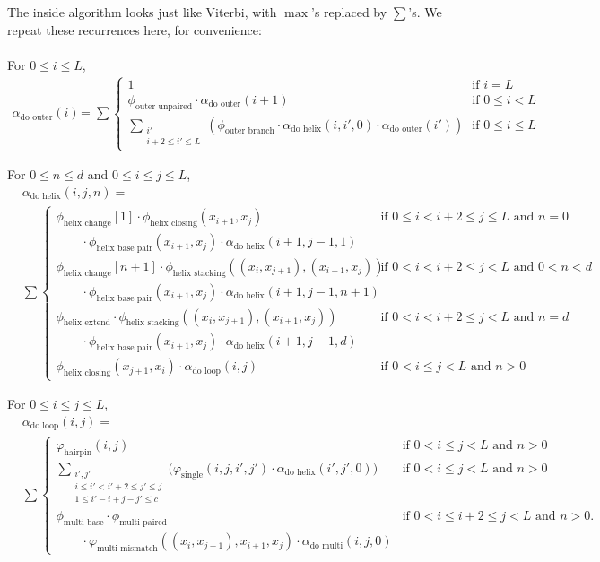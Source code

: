 \documentclass{article}
\newcommand{\Adoouter}{\alpha_\text{do outer}}
\newcommand{\outerunpaired}{\phi_\text{outer unpaired}}
\newcommand{\outerbranch}{\phi_\text{outer branch}}
\newcommand{\vhairpin}{\varphi_\text{hairpin}}
\newcommand{\multimismatch}{\varphi_\text{multi mismatch}}
\newcommand{\helixstacking}{\phi_\text{helix stacking}}
\newcommand{\helixbasepair}{\phi_\text{helix base pair}}
\newcommand{\helixextend}{\phi_\text{helix extend}}
\newcommand{\helixclosing}{\phi_\text{helix closing}}
\newcommand{\helixchange}{\phi_\text{helix change}}
\newcommand{\Adoloop}{\alpha_\text{do loop}}
\newcommand{\single}{\varphi_\text{single}}
\newcommand{\Adomulti}{\alpha_\text{do multi}}
\newcommand{\multibase}{\phi_\text{multi base}}
\newcommand{\multipaired}{\phi_\text{multi paired}}
\newcommand{\Adohelix}{\alpha_\text{do helix}}
\begin{document}
  The inside algorithm looks just like Viterbi, with $\max$'s replaced by $\sum$'s.  We repeat
  these recurrences here, for convenience: \\
  \\
  \noindent
  For $0 \le i \le L$,
  \begin{align*}
    \Adoouter(i) &= \sum \begin{cases}
      1 & \text{if $i=L$} \\
      \outerunpaired \cdot \Adoouter(i+1) & \text{if $0 \le i < L$} \\
      \displaystyle \sum_{\substack{i' \\ i+2 \le i' \le L}} \left(\outerbranch \cdot \Adohelix(i,i',0) \cdot \Adoouter(i')\right)
      & \text{if $0 \le i \le L$}
    \end{cases}
  \end{align*}
  
  \noindent
  For $0 \le n \le d$ and $0 \le i \le j \le L$,
  \begin{align*}
    &\Adohelix(i,j,n) = \\
    &\sum \begin{cases}
      \helixchange[1] \cdot \helixclosing (x_{i+1}, x_j) & \text{if $0 \le i < i+2\le j \le L$ and $n=0$} \\
      \qquad{} \cdot \helixbasepair (x_{i+1}, x_j) \cdot \Adohelix(i+1,j-1,1) \\
      \helixchange[n+1] \cdot \helixstacking((x_{i},x_{j+1}),(x_{i+1},x_{j})) & \text{if $0 < i < i+2\le j < L$ and $0 < n < d$} \\
      \qquad{} \cdot \helixbasepair (x_{i+1}, x_j) \cdot \Adohelix(i+1,j-1,n+1) \\
      \helixextend \cdot \helixstacking((x_{i},x_{j+1}),(x_{i+1},x_{j})) & \text{if $0<i<i+2\le j<L$ and $n=d$} \\
      \qquad{} \cdot \helixbasepair (x_{i+1}, x_j) \cdot \Adohelix(i+1,j-1,d) \\
      \helixclosing (x_{j+1}, x_i) \cdot \Adoloop(i,j) & \text{if $0<i\le j<L$ and $n>0$} 
    \end{cases}
  \end{align*}

  \noindent
  For $0 \le i \le j \le L$,
  \begin{align*}
    &\Adoloop(i,j) = \\
    &\sum \begin{cases}
      \vhairpin(i,j) & \text{if $0<i\le j<L$ and $n>0$} \\
      \displaystyle \sum_{\substack{i', j' \\ i \le i' < i'+2 \le j' \le j \\ 1 \le i'-i + j-j' \le c}}
      \bigl(\single(i,j,i',j') \cdot \Adohelix(i',j',0)\bigr) & \text{if $0<i\le j<L$ and $n>0$} \\
      \multibase \cdot \multipaired & \text{if $0<i\le i+2 \le j<L$ and $n>0$.} \\
      \qquad{} \cdot \multimismatch((x_i,x_{j+1}),x_{i+1},x_j) \cdot \Adomulti(i,j,0)
    \end{cases}
  \end{align*}
  
\end{document}
